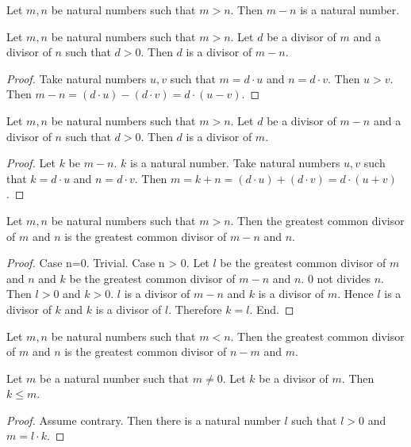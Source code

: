 \documentclass{article}
\begin{document}
\begin{forthel}

\begin{lemma}
Let $m,n$ be natural numbers such that $m > n$. Then $m-n$ is a natural number.
\end{lemma}

\begin{proposition}
Let $m,n$ be natural numbers such that $m > n$.
Let $d$ be a divisor of $m$ and a divisor of $n$ such that $d > 0$.
Then $d$ is a divisor of $m-n$.
\end{proposition}
\begin{proof}
Take natural numbers $u,v$ such that $m = d \cdot u$ and $n = d \cdot v$.
Then $u > v$.
Then $m - n =
(d \cdot u) - (d \cdot v) =
d \cdot (u - v)$.
\end{proof}

\begin{proposition}
Let $m,n$ be natural numbers such that $m > n$.
Let $d$ be a divisor of $m-n$ and a divisor of $n$ such that $d > 0$.
Then $d$ is a divisor of $m$.
\end{proposition}
\begin{proof}
Let $k$ be $m-n$. $k$ is a natural number.
Take natural numbers $u,v$ such that $k = d \cdot u$ and $n = d \cdot v$.
Then $m = k + n =
(d \cdot u) + (d \cdot v) = 
d \cdot (u + v)$.
\end{proof}

\begin{lemma}
Let $m,n$ be natural numbers such that $m > n$. Then
the greatest common divisor of $m$ and $n$ 
is the greatest common divisor of $m-n$ and $n$.
\end{lemma}
\begin{proof}
Case n=0. Trivial.
Case n > 0.
Let $l$ be the greatest common divisor of $m$ and $n$ 
and $k$ be the greatest common divisor of $m-n$ and $n$.
$0$ not divides $n$. Then $l > 0$ and $k > 0$. 
$l$ is a divisor of $m-n$ and $k$ is a divisor of $m$.
Hence $l$ is a divisor of $k$ and $k$ is a divisor of $l$. Therefore $k=l$. End.
\end{proof}


\begin{proposition}
Let $m,n$ be natural numbers such that $m < n$. Then
the greatest common divisor of $m$ and $n$ 
is the greatest common divisor of $n-m$ and $m$.
\end{proposition}

\begin{lemma}
Let $m$ be a natural number such that $m \neq 0$.
Let $k$ be a divisor of $m$.
Then $k \leq m$.
\end{lemma}
\begin{proof}
Assume contrary.
Then there is a natural number $l$ such that
$l > 0$ and $m = l \cdot k$.
\end{proof}


\end{forthel}
\end{document}
